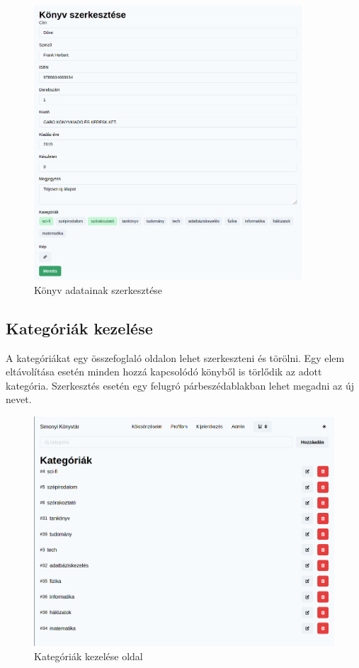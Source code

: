 \begin{figure}[!ht]
  \centering
  \includegraphics[width=100mm, keepaspectratio]{figures/book-edit.png}
  \caption{Könyv adatainak szerkesztése}
  \label{fig:BookEdit}
\end{figure}

\subsection{Kategóriák kezelése}

A kategóriákat egy összefoglaló oldalon lehet szerkeszteni és törölni. Egy elem eltávolítása esetén
minden hozzá kapcsolódó könyből is törlődik az adott kategória. Szerkesztés esetén egy felugró párbeszédablakban lehet
megadni az új nevet.

\begin{figure}[!ht]
  \centering
  \includegraphics[width=150mm, keepaspectratio]{figures/category-admin-list.png}
  \caption{Kategóriák kezelése oldal}
  \label{fig:CategoryAdmin}
\end{figure}

